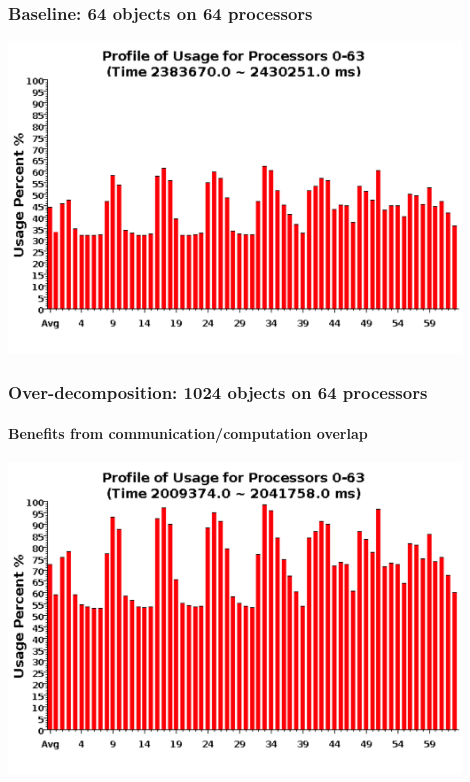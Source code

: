{\begin{frame}[fragile]
\frametitle{Baseline: 64 objects on 64 processors}
\begin{center}\includegraphics[width=0.9\textwidth]{figures/usageNonVirtual.png}\end{center}
\end{frame}

\begin{frame}[fragile]
\frametitle{Over-decomposition: 1024 objects on 64 processors}
\framesubtitle{Benefits from communication/computation overlap}
\begin{center}\includegraphics[width=0.9\textwidth]{figures/usageVirtual.png}\end{center}
\end{frame}

}
